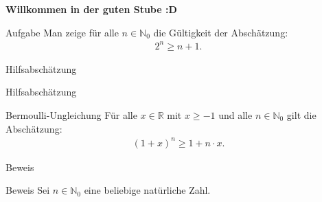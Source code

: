 \documentclass[10pt]{beamer}
\title{}
\author{Artur's \( \oint \) Mathematikstübchen}
\date{}
\def\bN{\mathbb{N}}
\def\bR{\mathbb{R}}
\begin{document}

\begin{frame}
    \begin{center}
        \textbf{\huge Willkommen in der guten Stube \newline \newline :D}
    \end{center}
\end{frame}




\begin{frame}
    \begin{alertblock}{Aufgabe}
        Man zeige für alle \( n \in \bN_{0} \) die Gültigkeit der Abschätzung:
        \begin{align*}
            2^{n}
            \geq n + 1.
        \end{align*}
    \end{alertblock}
\end{frame}



\begin{frame}{Hilfsabschätzung}
    
\end{frame}



\begin{frame}{Hilfsabschätzung}
    \begin{block}{Bermoulli-Ungleichung}
        Für alle \( x \in \bR \) mit \( x \geq - 1 \) und alle \( n \in \bN_{0} \) gilt die Abschätzung:
        \begin{align*}
            \left( 1 + x \right)^{n}
            \geq 1 + n \cdot x.
        \end{align*}
    \end{block}
\end{frame}



\begin{frame}{Beweis}
    
\end{frame}



\begin{frame}{Beweis}
    Sei \( n \in \bN_{0} \) eine beliebige natürliche Zahl.
\end{frame}
\end{document}

